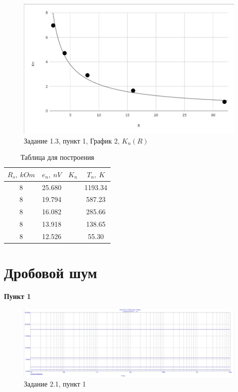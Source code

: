\documentclass[a4paper, 14pt]{extarticle}%
\begin{document}
\begin{figure}[h!]
			\centering
			\includegraphics[width=1.1\linewidth]{1.3/pic10.jpg}
			\caption{Задание 1.3, пункт 1, График 2, $K_n(R)$}
			\label{A}
\end{figure}



\begin{table}[h!]
  \caption{Таблица для построения}
  \begin{center}
  	\begin{tabular}{|c|c|c|c|}
  	    \hline
  	$R_s, \: kOm$ & $e_n, \: nV$ & $K_n$ & $T_n, \: K$ \\
  	    \hline
  	8 & 25.680 &  & 1193.34   \\
  		\hline
  	8 & 19.794 &  & 587.23    \\
  		\hline
  	8 & 16.082  &   & 285.66   \\
  		\hline
    8 & 13.918  &   &  138.65   \\
        \hline
    8 & 12.526  &   & 55.30    \\
        \hline
  	\end{tabular}
  \end{center}
\label{B_table}
\end{table}


\newpage
\newpage
\section{Дробовой шум}
\textbf{Пункт 1}
\begin{figure}[h!]
			\centering
			\includegraphics[width=1.1\linewidth]{2.1/pic12.jpg}
			\caption{Задание 2.1, пункт 1}
			\label{A}
\end{figure}
\end{document}
